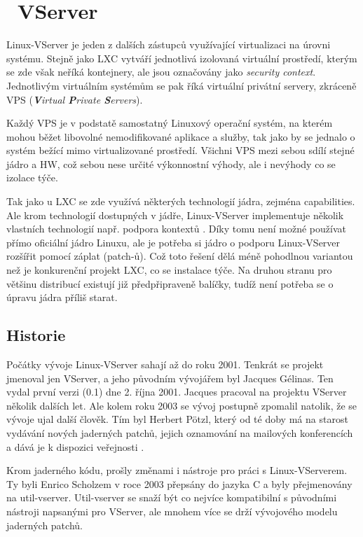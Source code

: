\section{\linux\ VServer\textsuperscript{\texttrademark}}

Linux-VServer je jeden z dalších zástupců využívající virtualizaci na úrovni systému. Stejně jako LXC vytváří jednotlivá izolovaná virtuální prostředí, kterým se zde však neříká kontejnery, ale jsou označovány jako \emph{security context}. Jednotlivým virtuálním systémům se pak říká virtuální privátní servery, zkráceně VPS (\emph{\textbf{V}irtual \textbf{P}rivate \textbf{S}ervers}).

Každý VPS je v podstatě samostatný Linuxový operační systém, na kterém mohou běžet libovolné nemodifikované aplikace a služby, tak jako by se jednalo o systém bežící mimo virtualizované prostředí. Všichni VPS mezi sebou sdílí stejné jádro a HW, což sebou nese určité výkonnostní výhody, ale i nevýhody co se izolace týče.

Tak jako u LXC se zde využívá některých technologií jádra, zejména capabilities. Ale krom technologií dostupných v jádře, Linux-VServer implementuje několik vlastních technologií např. podpora kontextů \cite{tomecek:lvs}. Díky tomu není možné používat přímo oficiální jádro Linuxu, ale je potřeba si jádro o podporu Linux-VServer rozšířit pomocí záplat (patch-ů). Což toto řešení dělá méně pohodlnou variantou než je konkurenční projekt LXC, co se instalace týče. Na druhou stranu pro většinu distribucí existují již předpřipraveně balíčky, tudíž není potřeba se o úpravu jádra příliš starat.

\subsection{Historie}
Počátky vývoje Linux-VServer sahají až do roku 2001. Tenkrát se projekt jmenoval jen VServer, a jeho původním vývojářem byl Jacques Gélinas. Ten vydal první verzi (0.1) dne 2. října 2001. Jacques pracoval na projektu VServer několik dalších let. Ale kolem roku 2003 se vývoj postupně zpomalil natolik, že se vývoje ujal další člověk. Tím byl Herbert Pötzl, který od té doby má na starost vydávání nových jaderných patchů, jejich oznamování na mailových konferencích a dává je k dispozici veřejnosti \cite{lvs:history}.

Krom jaderného kódu, prošly změnami i nástroje pro práci s Linux-VServerem. Ty byli Enrico Scholzem v roce 2003 přepsány do jazyka C a byly přejmenovány na util-vserver. Util-vserver se snaží být co nejvíce kompatibilní s původními nástroji napsanými pro VServer, ale mnohem více se drží vývojového modelu jaderných patchů.

